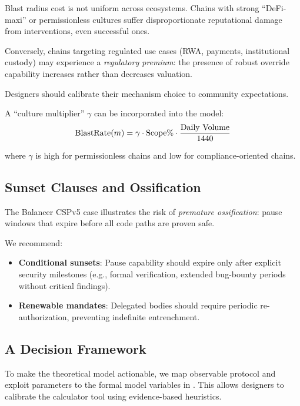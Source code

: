 \documentclass[12pt]{article}
\newif\ifconcise
\begin{document}
Blast radius cost is not uniform across ecosystems.
Chains with strong ``DeFi-maxi'' or permissionless cultures suffer disproportionate reputational damage from interventions, even successful ones.

Conversely, chains targeting regulated use cases (RWA, payments, institutional custody) may experience a \emph{regulatory premium}: the presence of robust override capability increases rather than decreases valuation.

Designers should calibrate their mechanism choice to community expectations.

A ``culture multiplier'' $\gamma$ can be incorporated into the model:
\[
\mathrm{BlastRate}(m) = \gamma \cdot \text{Scope\%} \cdot \frac{\text{Daily Volume}}{1440}
\]

where $\gamma$ is high for permissionless chains and low for compliance-oriented chains.


\ifconcise\else
\subsection{Sunset Clauses and Ossification}
\label{subsec:sunset}

The Balancer CSPv5 case illustrates the risk of \emph{premature ossification}: pause windows that expire before all code paths are proven safe.

We recommend:
\begin{itemize}
    \item \textbf{Conditional sunsets}: Pause capability should expire only after explicit security milestones (e.g., formal verification, extended bug-bounty periods without critical findings).
    \item \textbf{Renewable mandates}: Delegated bodies should require periodic re-authorization, preventing indefinite entrenchment.
\end{itemize}
\fi



\subsection{A Decision Framework}
\label{subsec:framework}

To make the theoretical model actionable, we map observable protocol and exploit parameters to the formal model variables in . This allows designers to calibrate the calculator tool using evidence-based heuristics.
\end{document}
